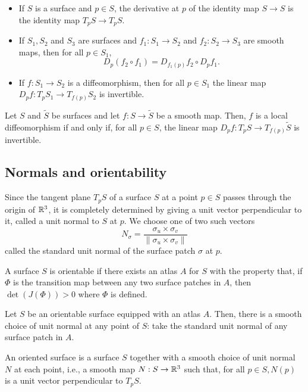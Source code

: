 \begin{proposition}
  \begin{itemize}
    \item If $S$ is a surface and $p \in S$, the derivative at $p$ of the
    identity map $S \to S$ is the identity map $T_p S \to T_p S$.
    \item If $S_1, S_2$ and $S_3$ are surfaces and $f_1 : S_1 \to S_2$
    and $f_2: S_2 \to S_3$ are smooth maps, then for all $p \in S_1$,
    \[
      D_p(f_2 \circ f_1) = D_{f_1(p)} f_2 \circ D_p f_1.
    \]
    \item If $f: S_1 \to S_2$ is a diffeomorphism, then for all $p \in S_1$
    the linear map $D_p f: T_p S_1 \to T_{f(p)} S_2$ is invertible.
  \end{itemize}
\end{proposition}

\begin{proposition}
  Let $S$ and $\tilde S$ be surfaces and let $f: S \to \tilde S$ be a
  smooth map. Then, $f$ is a local diffeomorphism if and only if,
  for all $p \in S$, the linear map $D_p f: T_p S \to T_{f(p)} \tilde S$
  is invertible.
\end{proposition}

\subsection{Normals and orientability}

Since the tangent plane $T_p S$ of a surface $S$ at a point $p \in S$
passes through the origin of $\mathbb{R}^3$, it is completely determined
by giving a unit vector perpendicular to it, called a unit normal to
$S$ at $p$. We choose one of two such vectors
\[
  N_{\sigma}   = \frac{\sigma_u \times \sigma_v}{\|\sigma_u \times \sigma_v\|}
\]
called the standard unit normal of the surface patch $\sigma$ at $p$.

\begin{defn}
  A surface $S$ is orientable if there exists an atlas $A$ for $S$ with the
  property that, if $\Phi$ is the transition map between any two surface patches
  in $A$, then $\det(J(\Phi)) > 0$ where $\Phi$ is defined.
\end{defn}

\begin{proposition}
  Let $S$ be an orientable surface equipped with an atlas $A$.
  Then, there is a smooth choice of unit normal at any point of $S$:
  take the standard unit normal of any surface patch in $A$.
\end{proposition}

An oriented surface is a surface $S$ together with a smooth choice
of unit normal $N$ at each point, i.e., a smooth map $N: S \to \mathbb{R}^3$
such that, for all $p \in S, N(p)$ is a unit vector perpendicular to
$T_p S$.